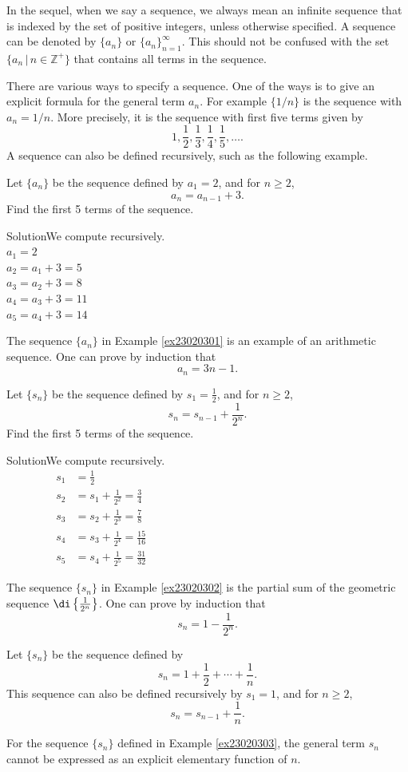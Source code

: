 In the sequel, when we say a sequence, we always mean an infinite sequence that is indexed by the set of positive integers, unless otherwise specified.
A sequence can be denoted by $\{a_n\}$ or $\{a_n\}_{n=1}^{\infty}$. This should not be confused with the set $\{a_n\,|\, n\in\mathbb{Z}^+\}$ that contains all terms in the sequence. 

There are various ways to specify a sequence. One of the ways is to give an explicit formula for the general term $a_n$. For example $\{1/n\}$ is the sequence with $a_n=1/n$. More precisely, it is the sequence with first five terms given by
\[1, \frac{1}{2}, \frac{1}{3}, \frac{1}{4}, \frac{1}{5}, \ldots.\]
A sequence can also be defined recursively, such as the following example. 

\begin{example}[label=ex23020301]{}
Let $\{a_n\}$ be the sequence defined by $a_1=2$, and for $n\geq 2$,
\[a_n=a_{n-1}+3.\]
  Find the first 5 terms of the sequence.
\end{example}
\begin{solution}{Solution}We compute recursively.\\
$
a_1 =2 $\\
$a_2= a_1+3=5 $\\
$a_3 =a_2+3=8$\\
$a_4 =a_3+3=11$\\
$a_5 =a_4+3=14$
 
\end{solution}
The sequence $\{a_n\}$ in Example \ref{ex23020301} is  an example of an arithmetic sequence. One can prove by induction that
\[a_n=3n-1.\]

\begin{example}[label=ex23020302]{}
Let $\{s_n\}$ be the sequence defined by $s_1=\frac{1}{2}$, and for $n\geq 2$,
\[s_n=s_{n-1}+\frac{1}{2^n}.\]
  Find the first 5 terms of the sequence.
\end{example}
\begin{solution}{Solution}We compute recursively.
\begin{align*}
s_1&=\frac{1}{2} \\
s_2&=s_1+\frac{1}{2^2} =\frac{3}{4}  \hspace{8cm}\\
s_3&=s_2+\frac{1}{2^3} =\frac{7}{8}\\
s_4&=s_3+\frac{1}{2^4} =\frac{15}{16} \\
s_5&=s_4+\frac{1}{2^5} =\frac{31}{32} \hspace{8cm}
\end{align*}
\end{solution}
The sequence $\{s_n\}$ in Example \ref{ex23020302} is the partial sum of the geometric sequence $\di\left\{\frac{1}{2^n}\right\}$. One can prove by induction that
\[s_n=1-\frac{1}{2^n}.\]
\begin{example}[label=ex23020303]{}
Let $\{s_n\}$ be the sequence defined by 
\[s_n=1+\frac{1}{2}+\cdots+\frac{1}{n}.\]
  This sequence can also be defined recursively by $s_1=1$, and for $n\geq 2$,
\[s_n=s_{n-1}+\frac{1}{n}.\]
\end{example}For the sequence $\{s_n\}$ defined in Example \ref{ex23020303}, the general term $s_n$ cannot be expressed as an explicit elementary function of $n$.

